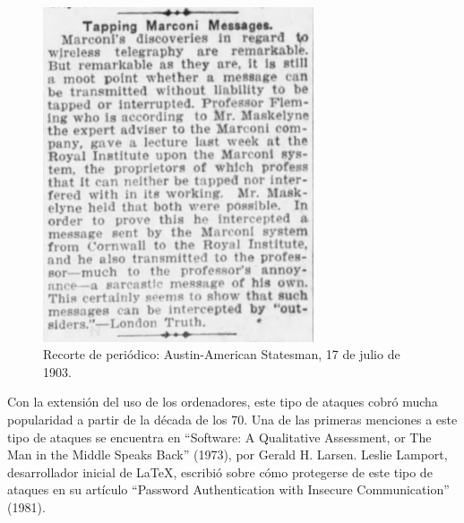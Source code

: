 \documentclass[11pt]{article}
\begin{document}
\begin{figure}[H]
	\centering
	\includegraphics[width=80mm]{images/memoir/marconi-paper}
	\caption{Recorte de periódico: Austin-American Statesman, 17 de julio de 1903.}
\end{figure}

Con la extensión del uso de los ordenadores, este tipo de ataques cobró mucha popularidad a partir de la década de los 70. Una de las
primeras menciones a este tipo de ataques se encuentra en ``Software: A Qualitative Assessment, or The Man in the Middle Speaks Back'' (1973), por
Gerald H. Larsen. Leslie Lamport, desarrollador inicial de \LaTeX, escribió sobre cómo protegerse de este tipo de ataques en su artículo
``Password Authentication with Insecure Communication'' (1981).
\end{document}
